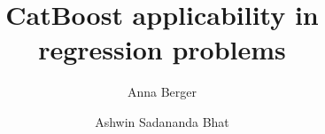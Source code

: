 \documentclass[format=acmsmall, review=false, screen=true]{acmart}
\begin{document}
\title{CatBoost applicability in regression problems}

\author{Anna Berger}

\author{Ashwin Sadananda Bhat}





\maketitle
\thispagestyle{plain}











 


\end{document}
